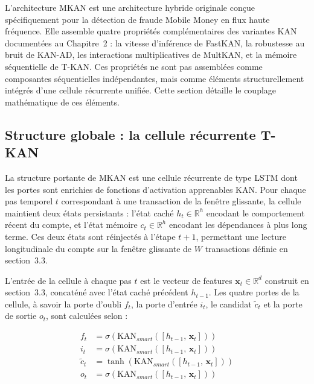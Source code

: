 \documentclass[11pt,a4paper,oneside]{report}
\theoremstyle{definition}
\theoremstyle{remark}
\begin{document}
L'architecture MKAN est une architecture hybride originale conçue spécifiquement pour la détection de fraude Mobile Money en flux haute fréquence. Elle assemble quatre propriétés complémentaires des variantes KAN documentées au Chapitre~2 : la vitesse d'inférence de FastKAN, la robustesse au bruit de KAN-AD, les interactions multiplicatives de MultKAN, et la mémoire séquentielle de T-KAN. Ces propriétés ne sont pas assemblées comme composantes séquentielles indépendantes, mais comme éléments structurellement intégrés d'une cellule récurrente unifiée. Cette section détaille le couplage mathématique de ces éléments.

\subsection{Structure globale : la cellule récurrente T-KAN}

La structure portante de MKAN est une cellule récurrente de type LSTM dont les portes sont enrichies de fonctions d'activation apprenables KAN. Pour chaque pas temporel $t$ correspondant à une transaction de la fenêtre glissante, la cellule maintient deux états persistants : l'état caché $h_t \in \mathbb{R}^{h}$ encodant le comportement récent du compte, et l'état mémoire $c_t \in \mathbb{R}^{h}$ encodant les dépendances à plus long terme. Ces deux états sont réinjectés à l'étape $t+1$, permettant une lecture longitudinale du compte sur la fenêtre glissante de $W$ transactions définie en section~3.3.

L'entrée de la cellule à chaque pas $t$ est le vecteur de features $\mathbf{x}_t \in \mathbb{R}^{d}$ construit en section~3.3, concaténé avec l'état caché précédent $h_{t-1}$. Les quatre portes de la cellule, à savoir la porte d'oubli $f_t$, la porte d'entrée $i_t$, le candidat $\tilde{c}_t$ et la porte de sortie $o_t$, sont calculées selon :

\begin{align}
    f_t &= \sigma\!\left(\text{KAN}_{smart}\!\left([h_{t-1},\, \mathbf{x}_t]\right)\right) \\
    i_t &= \sigma\!\left(\text{KAN}_{smart}\!\left([h_{t-1},\, \mathbf{x}_t]\right)\right) \\
    \tilde{c}_t &= \tanh\!\left(\text{KAN}_{smart}\!\left([h_{t-1},\, \mathbf{x}_t]\right)\right) \\
    o_t &= \sigma\!\left(\text{KAN}_{smart}\!\left([h_{t-1},\, \mathbf{x}_t]\right)\right)
\end{align}
\end{document}
